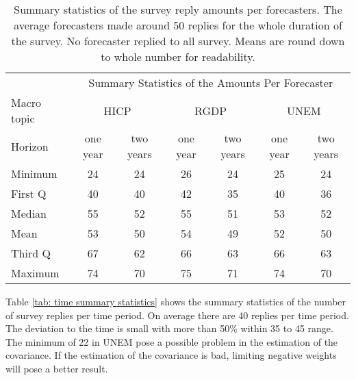 \documentclass[11pt]{article}
\begin{document}
\begin{table}[!h]
	\centering
	\caption{Summary statistics of the survey reply amounts per forecasters. The average forecasters made around 50 replies for the whole duration of the survey. No forecaster replied to all survey. Means are round down to whole number for readability.}
	\label{tab: forecaster summary statistics}
	\begin{tabular}{lcccccc}%
		\hline
		&\multicolumn{6}{c}{Summary Statistics of the Amounts Per Forecaster}\\
		\cmidrule(lr){2-7}
		Macro topic & \multicolumn{2}{c}{HICP} & \multicolumn{2}{c}{RGDP} & \multicolumn{2}{c}{UNEM} \\
		\cmidrule(lr){2-3} \cmidrule(lr){4-5}\cmidrule(lr){6-7}
		Horizon     & one year & two years & one year & two years & one year & two years \\ 
		\hline
		Minimum & 24    & 24    & 26    & 24    & 25    & 24    \\
		First Q & 40    & 40    & 42    & 35    & 40    & 36    \\
		Median  & 55    & 52    & 55    & 51    & 53    & 52    \\
		Mean    & 53    & 50    & 54    & 49    & 52    & 50    \\
		Third Q & 67    & 62    & 66    & 63    & 66    & 63    \\
		Maximum & 74    & 70    & 75    & 71    & 74    & 70      \\ 
		\hline
	\end{tabular}
\end{table}

Table \ref{tab: time summary statistics} shows the summary statistics of the number of survey replies per time period. On average there are 40 replies per time period. The deviation to the time is small with more than 50\% within 35 to 45 range. The minimum of 22 in UNEM pose a possible problem in the estimation of the covariance. If the estimation of the covariance is bad, limiting negative weights will pose a better result.
\end{document}
